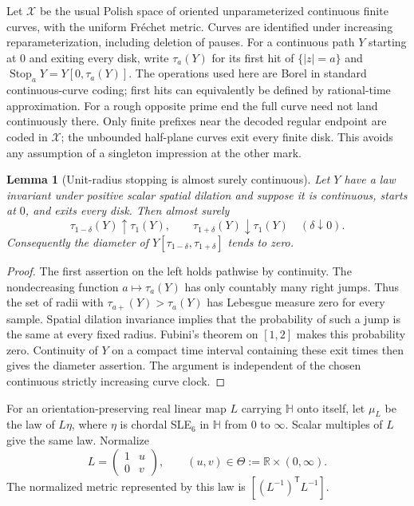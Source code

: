 \documentclass[11pt]{article}
\newtheorem{lemma}[theorem]{Lemma}
\theoremstyle{definition}\newtheorem{definition}[theorem]{Definition}
\theoremstyle{remark}\newtheorem{remark}[theorem]{Remark}
\begin{document}
Let $\mathcal X$ be the usual Polish space of oriented unparameterized
continuous finite curves, with the uniform Fr\'echet metric. Curves are
identified under increasing reparameterization, including deletion of
pauses. For a continuous path $Y$ starting at $0$ and exiting every disk,
write $\tau_a(Y)$ for its first hit of $\{|z|=a\}$ and
$\operatorname{Stop}_aY=Y[0,\tau_a(Y)]$.
The operations used here are Borel in standard continuous-curve coding;
first hits can equivalently be defined by rational-time approximation.
For a rough opposite prime end the full curve need not land continuously
there. Only finite prefixes near the decoded regular endpoint are coded
in $\mathcal X$; the unbounded half-plane curves exit every finite disk.
This avoids any assumption of a singleton impression at the other mark.

\begin{lemma}[Unit-radius stopping is almost surely continuous]
\label{lem:ed-goodradius}
Let $Y$ have a law invariant under positive scalar spatial dilation and
suppose it is continuous, starts at $0$, and exits every disk. Then almost
surely
\[
 \tau_{1-\delta}(Y)\uparrow\tau_1(Y),\qquad
 \tau_{1+\delta}(Y)\downarrow\tau_1(Y)
 \quad(\delta\downarrow0).
\]
Consequently the diameter of
$Y[\tau_{1-\delta},\tau_{1+\delta}]$ tends to zero.
\end{lemma}
\begin{proof}
The first assertion on the left holds pathwise by continuity. The
nondecreasing function $a\mapsto\tau_a(Y)$ has only countably many
right jumps. Thus the set of radii with
$\tau_{a+}(Y)>\tau_a(Y)$ has Lebesgue measure zero for every sample.
Spatial dilation invariance implies that the probability of such a jump
is the same at every fixed radius. Fubini's theorem on $[1,2]$ makes this
probability zero. Continuity of $Y$ on a compact time interval containing
these exit times then gives the diameter assertion. The argument is
independent of the chosen continuous strictly increasing curve clock.
\end{proof}

For an orientation-preserving real linear map $L$ carrying $\mathbb H$
onto itself, let $\mu_L$ be the law of $L\eta$, where $\eta$ is chordal
SLE$_6$ in $\mathbb H$ from $0$ to $\infty$. Scalar multiples of $L$
give the same law. Normalize
\[
 L=\begin{pmatrix}1&u\\0&v\end{pmatrix},\qquad
 (u,v)\in\Theta:=\mathbb R\times(0,\infty).
 \tag{ED1}
\]
The normalized metric represented by this law is
$[(L^{-1})^{\mathsf T}L^{-1}]$.
\end{document}
